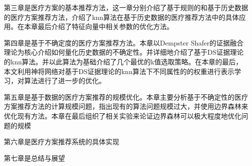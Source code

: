 第三章是医疗方案的基本推荐方法，这一章分别介绍了基于规则的和基于历史数据的医疗方案推荐方法，介绍了knn算法在基于历史数据的医疗推荐方法中的具体应用。在本章最后介绍了特征向量中相关参数的优化方法。

第四章是基于不确定度的医疗方案推荐方法。本章以Dempster Shafer的证据融合理论为核心介绍如何量化历史数据的不确定性。并详细地介绍了基于DS证据理论的knn算法。并以此算法为基础介绍了几个最优的k值选取策略。在本章的最后，本文利用神将网络对基于DS证据理论的knn算法下不同属性的的权重进行表示学习，对算法进行了进一步的优化。

第五章是基于数据的医疗方案推荐的规模优化。本章主要分析基于不确定性的医疗方案推荐方法的计算规模问题，指出现有的算法问题规模过大，并使用边界森林来优化现有方法。本章在最后组织了相关实验来论证边界森林可以极大程度地优化问题的规模

第六章是医疗方案推荐系统的具体实现

第七章是总结与展望








